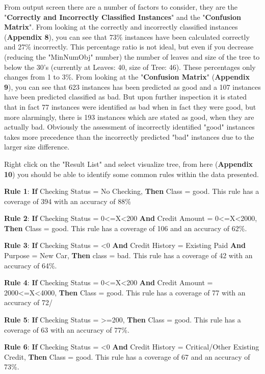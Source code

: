 \documentclass[12pt, a4paper]{article}
\begin{document}
    From output screen there are a number of factors to consider, they are the "\textbf{Correctly and Incorrectly Classified Instances}" and the "\textbf{Confusion Matrix}". From looking at the correctly and incorrectly classified instances (\textbf{Appendix 8}), you can see that 73\% instances have been calculated correctly and 27\% incorrectly. This percentage ratio is not ideal, but even if you decrease (reducing the "MinNumObj" number) the number of leaves and size of the tree to below the 30's (currently at Leaves: 40, size of Tree: 46). These percentages only changes from 1 to 3\%.  From looking at the "\textbf{Confusion Matrix}" (\textbf{Appendix 9}), you can see that 623 instances has been predicted as good and a 107 instances have been predicted classified as bad. But upon further inspection it is stated that in fact 77 instances were identified as bad when in fact they were good, but more alarmingly, there is 193 instances which are stated as good, when they are actually bad. Obviously the assessment of incorrectly identified "good" instances takes more precedence than the incorrectly predicted "bad" instances due to the larger size difference.
    
    Right click on the "Result List" and select visualize tree, from here (\textbf{Appendix 10}) you should be able to identify some common rules within the data presented.
    
    \textbf{Rule 1}: \textbf{If} Checking Status = No Checking, \textbf{Then} Class = good. This rule has a coverage of 394 with an accuracy of 88\%
    
    \textbf{Rule 2}: \textbf{If} Checking Status = 0<=X<200 \textbf{And} Credit Amount = 0<=X<2000, \textbf{Then} Class = good. This rule has a coverage of 106 and an accuracy of 62\%.
    
    \textbf{Rule 3}: \textbf{If} Checking Status = <0 \textbf{And} Credit History = Existing Paid \textbf{And} Purpose = New Car, \textbf{Then} class = bad. This rule has a coverage of 42 with an accuracy of 64\%.
    
    \textbf{Rule 4}: \textbf{If} Checking Status = 0<=X<200 \textbf{And} Credit Amount = 2000<=X<4000, \textbf{Then} Class = good. This rule has a coverage of 77 with an accuracy of 72/%
    
    \textbf{Rule 5}: \textbf{If} Checking Status = >=200, \textbf{Then} Class = good. This rule has a coverage of 63 with an accuracy of 77\%.
    
    \textbf{Rule 6}: \textbf{If} Checking Status = <0 \textbf{And} Credit History = Critical/Other Existing Credit, \textbf{Then} Class = good. This rule has a coverage of 67 and an accuracy of 73\%.
    
\end{document}
